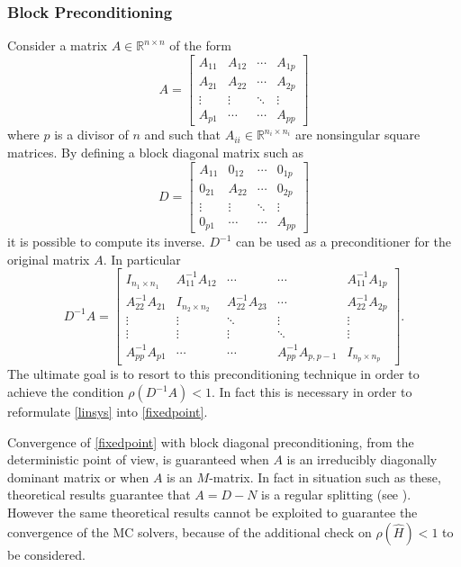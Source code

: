 \documentclass[a4paper,10pt]{article}
\begin{document}
\subsubsection*{Block Preconditioning}
Consider a matrix $A\in\mathbb{R}^{n\times n}$ of the form
\[
 A=\begin{bmatrix}A_{11} & A_{12} & \cdots & A_{1p}\\
    A_{21} & A_{22} & \cdots & A_{2p}\\
    \vdots & \vdots & \ddots & \vdots \\
    A_{p1} & \cdots & \cdots & A_{pp}
   \end{bmatrix}
\]
where $p$ is a divisor of $n$ and such that $A_{ii} \in \mathbb{R}^{n_i
\times n_i}$ are nonsingular square matrices.
By defining a block diagonal matrix such as
\[
 D=\begin{bmatrix}A_{11} & 0_{12} & \cdots & 0_{1p}\\
    0_{21} & A_{22} & \cdots & 0_{2p}\\
    \vdots & \vdots & \ddots & \vdots \\
    0_{p1} & \cdots & \cdots & A_{pp}
   \end{bmatrix}
\]
it is possible to compute its inverse.
$D^{-1}$  can be used as a preconditioner for the original matrix $A$.
In particular
\[
 D^{-1}A=\begin{bmatrix}I_{n_1\times n_1} & A_{11}^{-1}A_{12} & \cdots &
\cdots & A_{11}^{-1}A_{1p} \\
A_{22}^{-1}A_{21} & I_{n_2\times n_2} & A_{22}^{-1}A_{23} &
\cdots & A_{22}^{-1}A_{2p}\\
\vdots & \vdots & \ddots & \vdots & \vdots\\
\vdots & \vdots & \vdots &\ddots & \vdots \\
A_{pp}^{-1}A_{p1} &  \cdots & \cdots&
A_{pp}^{-1}A_{p,p-1} & I_{n_p \times n_p}
\end{bmatrix}.
\]
The ultimate goal is to resort to this preconditioning technique in order to
achieve the condition $\rho(D^{-1}A)<1$. In fact this is necessary in order to
reformulate \ref{linsys} into \ref{fixedpoint}.

Convergence of \ref{fixedpoint} with block diagonal preconditioning, from the
deterministic point of view, is guaranteed when $A$ is an irreducibly
diagonally dominant matrix or when $A$ is an $M$-matrix. In fact in situation
such as these, theoretical results guarantee that $A=D-N$ is a regular
splitting (see \cite{Ax1996}). However the same theoretical results cannot be
exploited to guarantee the convergence of the MC solvers, because of the
additional check on $\rho(\hat{H})<1$ to be considered.
\end{document}
